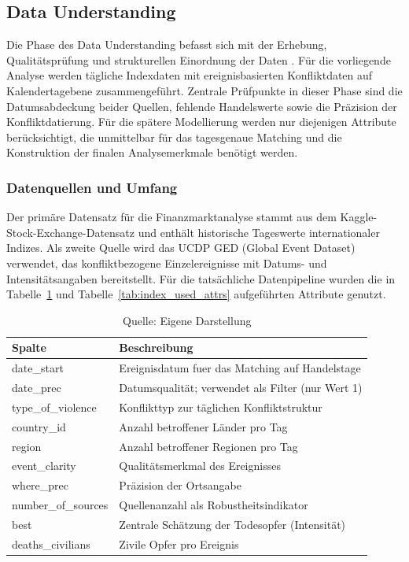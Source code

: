 \documentclass[12pt,a4paper]{article}
\begin{document}
\subsection{Data Understanding}
Die Phase des Data Understanding befasst sich mit der Erhebung, Qualitätsprüfung und strukturellen Einordnung der Daten \parencite{chapman2000crisp}. Für die vorliegende Analyse werden tägliche Indexdaten mit ereignisbasierten Konfliktdaten auf Kalendertagebene zusammengeführt. Zentrale Prüfpunkte in dieser Phase sind die Datumsabdeckung beider Quellen, fehlende Handelswerte sowie die Präzision der Konfliktdatierung. Für die spätere Modellierung werden nur diejenigen Attribute berücksichtigt, die unmittelbar für das tagesgenaue Matching und die Konstruktion der finalen Analysemerkmale benötigt werden.

\subsubsection{Datenquellen und Umfang}
Der primäre Datensatz für die Finanzmarktanalyse stammt aus dem Kaggle-Stock-Exchange-Datensatz und enthält historische Tageswerte internationaler Indizes. Als zweite Quelle wird das UCDP GED (Global Event Dataset) verwendet, das konfliktbezogene Einzelereignisse mit Datums- und Intensitätsangaben bereitstellt. Für die tatsächliche Datenpipeline wurden die in Tabelle~\ref{tab:ucdp_used_attrs} und Tabelle~\ref{tab:index_used_attrs} aufgeführten Attribute genutzt.

\begin{table}[h!]
\centering
\caption{Genutzte Attribute aus den Konfliktdaten (UCDP GED)}
\label{tab:ucdp_used_attrs}
\begin{tabular}{@{}ll@{}}
\toprule
Spalte & Beschreibung \\ \midrule
date\_start & Ereignisdatum fuer das Matching auf Handelstage \\
date\_prec & Datumsqualität; verwendet als Filter (nur Wert 1) \\
type\_of\_violence & Konflikttyp zur täglichen Konfliktstruktur \\
country\_id & Anzahl betroffener Länder pro Tag \\
region & Anzahl betroffener Regionen pro Tag \\
event\_clarity & Qualitätsmerkmal des Ereignisses \\
where\_prec & Präzision der Ortsangabe \\
number\_of\_sources & Quellenanzahl als Robustheitsindikator \\
best & Zentrale Schätzung der Todesopfer (Intensität) \\
deaths\_civilians & Zivile Opfer pro Ereignis \\ \bottomrule
\end{tabular}
\caption*{\footnotesize Quelle: Eigene Darstellung}
\end{table}
\end{document}
